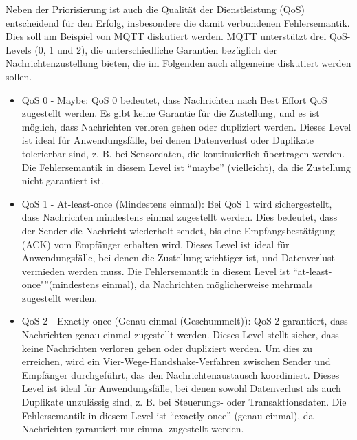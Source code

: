 \documentclass[../vs-script-first-v01.tex]{subfiles}
\begin{document}
Neben der Priorisierung ist auch die Qualität der Dienstleistung (QoS) entscheidend für den Erfolg, insbesondere die damit verbundenen Fehlersemantik. Dies soll am Beispiel von MQTT diskutiert werden.
MQTT unterstützt drei QoS-Levels (0, 1 und 2), die unterschiedliche Garantien bezüglich der Nachrichtenzustellung bieten, die im Folgenden  auch allgemeine diskutiert werden sollen. 
\begin{itemize}
\item QoS 0 - Maybe: QoS 0 bedeutet, dass Nachrichten nach Best Effort QoS zugestellt werden. Es gibt keine Garantie für die Zustellung, und es ist möglich, dass Nachrichten verloren gehen oder dupliziert werden. Dieses Level ist ideal für Anwendungsfälle, bei denen Datenverlust oder Duplikate tolerierbar sind, z. B. bei Sensordaten, die kontinuierlich übertragen werden. Die Fehlersemantik in diesem Level ist \enquote{maybe} (vielleicht), da die Zustellung nicht garantiert ist.
\item QoS 1 - At-least-once (Mindestens einmal):
Bei QoS 1 wird sichergestellt, dass Nachrichten mindestens einmal zugestellt werden. Dies bedeutet, dass der Sender die Nachricht wiederholt sendet, bis eine Empfangsbestätigung (ACK) vom Empfänger erhalten wird. Dieses Level ist ideal für Anwendungsfälle, bei denen die Zustellung wichtiger ist, und Datenverlust vermieden werden muss. Die Fehlersemantik in diesem Level ist \enquote{at-least-once"}(mindestens einmal), da Nachrichten möglicherweise mehrmals zugestellt werden.
\item QoS 2 - Exactly-once (Genau einmal (Geschummelt)):
QoS 2 garantiert, dass Nachrichten genau einmal zugestellt werden. Dieses Level stellt sicher, dass keine Nachrichten verloren gehen oder dupliziert werden. Um dies zu erreichen, wird ein Vier-Wege-Handshake-Verfahren zwischen Sender und Empfänger durchgeführt, das den Nachrichtenaustausch koordiniert. Dieses Level ist ideal für Anwendungsfälle, bei denen sowohl Datenverlust als auch Duplikate unzulässig sind, z. B. bei Steuerungs- oder Transaktionsdaten. Die Fehlersemantik in diesem Level ist \enquote{exactly-once} (genau einmal), da Nachrichten garantiert nur einmal zugestellt werden.
\end{itemize}
\end{document}
